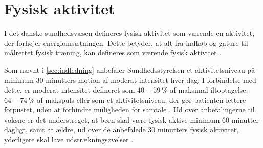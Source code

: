 \section{Fysisk aktivitet}

I det danske sundhedsvæsen defineres fysisk aktivitet som værende en aktivitet, der forhøjer energiomsætningen. Dette betyder, at alt fra indkøb og gåture til målrettet fysisk træning, kan defineres som værende fysisk aktivitet \citep{motionsraad2007, terkelsen2015}.

Som nævnt i \autoref{sec:indledning} anbefaler Sundhedsstyrelsen et aktivitetsniveau på minimum 30 minutters motion af moderat intensitet hver dag. I forbindelse med dette, er moderat intensitet defineret som $40-59~\%$ af maksimal iltoptagelse, $64-74~\%$ af makspuls eller som et aktivitetsniveau, der gør patienten lettere forpustet, uden at forhindre muligheden for samtale \citep{motionsraad2007}.
Ud over anbefalingerne til voksne er det understreget, at børn skal være fysisk aktive minimum 60 minutter dagligt, samt at ældre, ud over de anbefalede 30 minutters fysisk aktivitet, yderligere skal lave udstrækningsøvelser \citep{pedersen2011}. 

